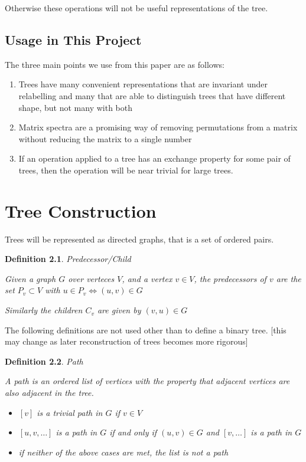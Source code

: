 \documentclass[10pt,a4paper]{report}
\newtheorem{definition}{Definition}
\begin{document}
Otherwise these operations will not be useful representations of the tree.

\section{Usage in This Project}

The three main points we use from this paper are as follows:
\begin{enumerate}
	\item Trees have many convenient representations that are invariant under
		relabelling and many that are able to distinguish trees that have
		different shape, but not many with both
	\item Matrix spectra are a promising way of removing permutations from a
		matrix without reducing the matrix to a single number
	\item If an operation applied to a tree has an exchange property for some
		pair of trees, then the operation will be near trivial for large trees.
\end{enumerate}

\chapter{Tree Construction}

Trees will be represented as directed graphs, that is a set of ordered pairs.

\begin{definition} Predecessor/Child

	Given a graph $G$ over verteces $V$, and a vertex $v \in V$, the
	predecessors of $v$ are the set $P_v \subset V$ with $u \in P_v
	\Leftrightarrow (u, v) \in G$

	Similarly the children $C_v$ are given by $(v, u) \in G$
\end{definition}

The following definitions are not used other than to define a binary tree.
[this may change as later reconstruction of trees becomes more rigorous]

\begin{definition} Path

	A path is an ordered list of vertices with the property that adjacent
	vertices are also adjacent in the tree.

	\begin{itemize}
		\item $[v]$ is a trivial path in $G$ if $v \in V$
		\item $[u, v, \ldots]$ is a path in $G$ if and only if $(u, v) \in G$
			and $[v, \ldots]$ is a path in $G$
		\item if neither of the above cases are met, the list is not a path
	\end{itemize}
\end{definition}
\end{document}
